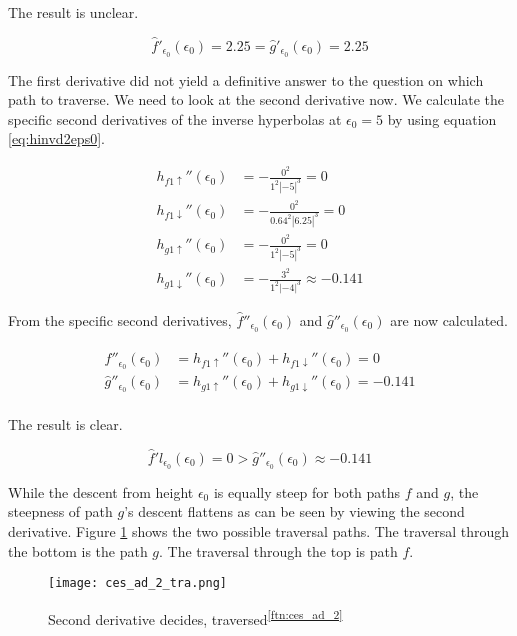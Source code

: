 The result is unclear.

$$\hat{f}'_{\epsilon_0}(\epsilon_0) = 2.25 = \hat{g}'_{\epsilon_0}(\epsilon_0) = 2.25$$

The first derivative did not yield a definitive answer to the question on which path to traverse. We need to look at the second derivative now. We calculate the specific second derivatives of the inverse hyperbolas at $\epsilon_0 = 5$ by using equation \ref{eq:hinvd2eps0}.

\begin{align*}
	h_{f1\uparrow}''(\epsilon_0) &= -\frac{0^2}{1^2 \left| -5 \right|^3} = 0\\
	h_{f1\downarrow}''(\epsilon_0) &= -\frac{0^2}{0.64^2 \left| 6.25 \right|^3} = 0\\
	h_{g1\uparrow}''(\epsilon_0) &= -\frac{0^2}{1^2 \left| -5 \right|^3} = 0\\
	h_{g1\downarrow}''(\epsilon_0) &= -\frac{3^2}{1^2 \left| -4 \right|^3} \approx -0.141 
\end{align*}

From the specific second derivatives, $\hat{f}''_{\epsilon_0}(\epsilon_0)$ and $\hat{g}''_{\epsilon_0}(\epsilon_0)$ are now calculated.

\begin{align*}
	\hat{f}''_{\epsilon_0}(\epsilon_0) &= h_{f1\uparrow}''(\epsilon_0) + h_{f1\downarrow}''(\epsilon_0) = 0\\
	\hat{g}''_{\epsilon_0}(\epsilon_0) &= h_{g1\uparrow}''(\epsilon_0) + h_{g1\downarrow}''(\epsilon_0) = -0.141\\
\end{align*}

The result is clear.

$$\hat{f}'l_{\epsilon_0}(\epsilon_0) = 0 > \hat{g}''_{\epsilon_0}(\epsilon_0) \approx -0.141$$

While the descent from height $\epsilon_0$ is equally steep for both paths $f$ and $g$, the steepness of path $g$'s descent flattens as can be seen by viewing the second derivative. Figure \ref{fig:ces_ad_2_tra} shows the two possible traversal paths. The traversal through the bottom is the path $g$. The traversal through the top is path $f$.

\begin{figure}[H]
	\centering
    
    \texttt{[image: ces\_ad\_2\_tra.png]}
		
	\caption{Second derivative decides, traversed\textsuperscript{\ref{ftn:ces_ad_2}}}
    \label{fig:ces_ad_2_tra}
\end{figure}


